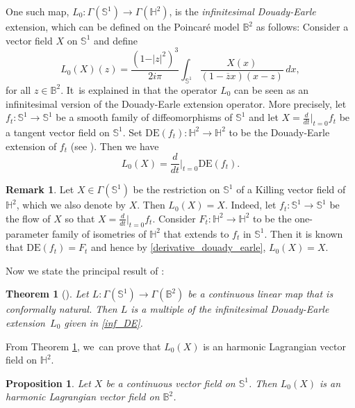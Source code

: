 \documentclass[JEP,XML,SOM,Unicode,NoEqCountersInSection, NoFloatCountersInSection,published]{cedram}
\theoremstyle{plain}
\newtheorem{theorem}[cor]{Theorem}
\newtheorem{prop}[cor]{Proposition}
\theoremstyle{definition}
\newtheorem{remark}[cor]{Remark}
\begin{document}
One such map, $L_0:\Gamma(\mathbb{S}^1) \to \Gamma(\mathbb{H}^2)$, is the \emph{infinitesimal Douady-Earle} extension, which can be defined on the Poincaré model $\mathbb{B}^2$ as follows: Consider a vector field $X$ on $\mathbb{S}^1$ and define
\begin{equation}\label{inf_DE}
L_0(X)(z)=\frac{(1-\vert z\vert^2)^3}{2i\pi}\int_{\mathbb{S}^1}\frac{X(x)}{(1-\overline{z}x)(x-z)}\,dx,
\end{equation}
for all $z\in\mathbb{B}^2$. It~is explained in \cite{Uniqueness_of_operator_L} that the operator $L_0$ can be seen as an infinitesimal version of the Douady-Earle extension operator. More precisely, let \hbox{$f_t: \mathbb{S}^1 \to \mathbb{S}^1$} be a smooth family of diffeomorphisms of $\mathbb{S}^1$ and let $X = \frac{d}{dt}\big|_{t=0} f_t$ be a tangent vector field on $\mathbb{S}^1$. Set $\mathrm{DE}(f_t): \mathbb{H}^2 \to \mathbb{H}^2$ to be the Douady-Earle extension of $f_t$ (see \cite{Douady_Earle}). Then we have
\begin{equation}\label{derivative_douady_earle}
L_0(X)=\frac{d}{dt}\Big\lvert_{ t=0} \mathrm{DE}(f_t).
\end{equation}

\begin{remark}\label{douadyearly_killing}
Let $X \in \Gamma(\mathbb{S}^1)$ be the restriction on $\mathbb{S}^1$ of a Killing vector field of $\mathbb{H}^2$, which we also denote by $X$. Then $L_0(X)=X$. Indeed, let $f_t:\mathbb{S}^1\to\mathbb{S}^1$ be the flow of $X$ so that $X=\frac{d}{dt}\big\lvert_{t=0}f_t$. Consider $F_t: \mathbb{H}^2 \to \mathbb{H}^2$ to be the one-parameter family of isometries of $\mathbb{H}^2$ that extends to $f_t$ in $\mathbb{S}^1$. Then it is known that $\mathrm{DE}(f_t) = F_t$ and hence by \eqref{derivative_douady_earle}, $L_0(X)=X$.
\end{remark}
Now we state the principal result of \cite{Uniqueness_of_operator_L}:

\begin{theorem}[\cite{Uniqueness_of_operator_L}]\label{Uniqueness}
Let $L:\Gamma(\mathbb{S}^1) \to \Gamma(\mathbb{B}^2)$ be a continuous linear map that is conformally natural. Then $L$ is a multiple of the infinitesimal Douady-Earle extension~$L_0$ given in \eqref{inf_DE}.
\end{theorem}
From Theorem \ref{Uniqueness}, we~can prove that $L_0(X)$ is an harmonic Lagrangian vector field on $\mathbb{H}^2$.
\begin{prop}\label{L_0_harmonic_lagrangian}
Let $X$ be a continuous vector field on $\mathbb{S}^1$. Then $L_0(X)$ is an harmonic Lagrangian vector field on $\mathbb{B}^2$.
\end{prop}
\end{document}
